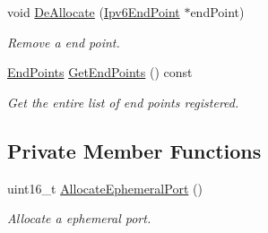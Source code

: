 \begin{DoxyCompactItemize}
void \hyperlink{classns3_1_1Ipv6EndPointDemux_ae3824e04716c63ceaca1de60c68f0834}{De\+Allocate} (\hyperlink{classns3_1_1Ipv6EndPoint}{Ipv6\+End\+Point} $\ast$end\+Point)
\begin{DoxyCompactList}\small\item\em Remove a end point. \end{DoxyCompactList}\item 
\hyperlink{classns3_1_1Ipv6EndPointDemux_a40c1d59189759e1e7f5cabe7cd01c0fa}{End\+Points} \hyperlink{classns3_1_1Ipv6EndPointDemux_ada184acdfffcf2049d8f3e93bf80f86e}{Get\+End\+Points} () const 
\begin{DoxyCompactList}\small\item\em Get the entire list of end points registered. \end{DoxyCompactList}\end{DoxyCompactItemize}
\subsection*{Private Member Functions}
\begin{DoxyCompactItemize}
\item 
uint16\+\_\+t \hyperlink{classns3_1_1Ipv6EndPointDemux_ab90aedc09152333c086615a8897568c8}{Allocate\+Ephemeral\+Port} ()
\begin{DoxyCompactList}\small\item\em Allocate a ephemeral port. \end{DoxyCompactList}\end{DoxyCompactItemize}
